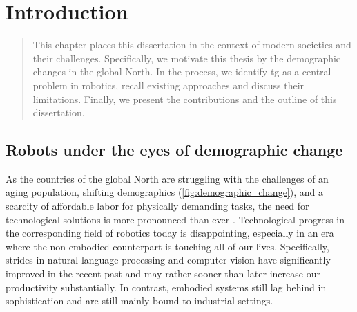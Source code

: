 \chapter{Introduction} %
\label{cha:intro}


\begin{abstract}
This chapter places this dissertation in the context of
modern societies and their challenges. Specifically, we
motivate this thesis by the demographic changes in the
global North. In the process, we identify
\acl{tg} as a central problem in robotics, recall existing
approaches and discuss their limitations. Finally, we
present the contributions and the outline of this
dissertation.
\end{abstract}

\newpage


\section{Robots under the eyes of demographic change}

As the countries of the global North are struggling with the
challenges of an aging population, shifting demographics
(\cref{fig:demographic_change}), and a scarcity of
affordable labor for physically demanding tasks, the need
for technological solutions is more pronounced than ever
\cite{ince2015economic,mcgrath2021report,astrov2021economies}.
Technological progress in the
corresponding field of robotics today is disappointing,
especially in an era where the non-embodied counterpart is
touching all of our lives. Specifically, strides in natural
language processing and computer vision have significantly
improved in the recent past and may rather sooner than later
increase our productivity substantially. In contrast, 
embodied systems still lag behind in
sophistication and are still mainly bound to industrial
settings.

